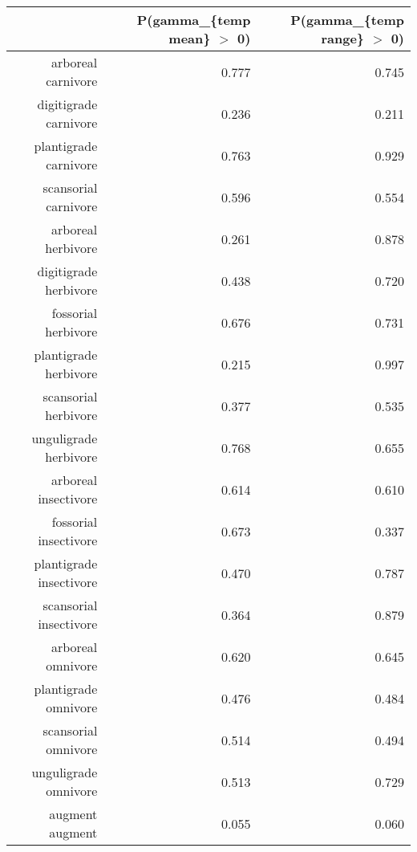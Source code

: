 \begin{table}[ht]
\centering
\begin{tabular}{rrr}
  \hline
 & P(gamma\_\{temp mean\} $>$ 0) & P(gamma\_\{temp range\} $>$ 0) \\ 
  \hline
arboreal carnivore & 0.777 & 0.745 \\ 
  digitigrade carnivore & 0.236 & 0.211 \\ 
  plantigrade carnivore & 0.763 & 0.929 \\ 
  scansorial carnivore & 0.596 & 0.554 \\ 
  arboreal herbivore & 0.261 & 0.878 \\ 
  digitigrade herbivore & 0.438 & 0.720 \\ 
  fossorial herbivore & 0.676 & 0.731 \\ 
  plantigrade herbivore & 0.215 & 0.997 \\ 
  scansorial herbivore & 0.377 & 0.535 \\ 
  unguligrade herbivore & 0.768 & 0.655 \\ 
  arboreal insectivore & 0.614 & 0.610 \\ 
  fossorial insectivore & 0.673 & 0.337 \\ 
  plantigrade insectivore & 0.470 & 0.787 \\ 
  scansorial insectivore & 0.364 & 0.879 \\ 
  arboreal omnivore & 0.620 & 0.645 \\ 
  plantigrade omnivore & 0.476 & 0.484 \\ 
  scansorial omnivore & 0.514 & 0.494 \\ 
  unguligrade omnivore & 0.513 & 0.729 \\ 
  augment augment & 0.055 & 0.060 \\ 
   \hline
\end{tabular}
\label{tab:surv_temp}
\end{table}
